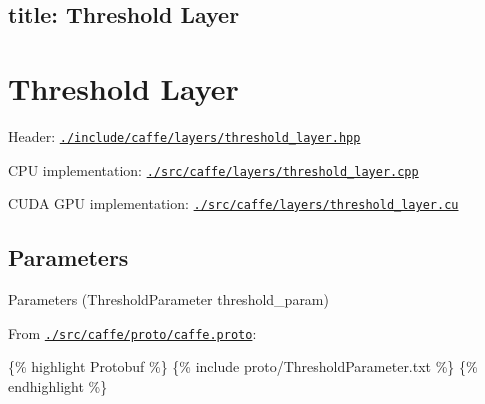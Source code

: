

 \subsection*{title\+: Threshold Layer }

\section*{Threshold Layer}


\begin{DoxyItemize}
\item Header\+: \href{https://github.com/BVLC/caffe/blob/master/include/caffe/layers/threshold_layer.hpp}{\tt {\ttfamily ./include/caffe/layers/threshold\+\_\+layer.hpp}}
\item C\+PU implementation\+: \href{https://github.com/BVLC/caffe/blob/master/src/caffe/layers/threshold_layer.cpp}{\tt {\ttfamily ./src/caffe/layers/threshold\+\_\+layer.cpp}}
\item C\+U\+DA G\+PU implementation\+: \href{https://github.com/BVLC/caffe/blob/master/src/caffe/layers/threshold_layer.cu}{\tt {\ttfamily ./src/caffe/layers/threshold\+\_\+layer.cu}}
\end{DoxyItemize}

\subsection*{Parameters}


\begin{DoxyItemize}
\item Parameters ({\ttfamily Threshold\+Parameter threshold\+\_\+param})
\item From \href{https://github.com/BVLC/caffe/blob/master/src/caffe/proto/caffe.proto}{\tt {\ttfamily ./src/caffe/proto/caffe.proto}}\+:
\end{DoxyItemize}

\{\% highlight Protobuf \%\} \{\% include proto/\+Threshold\+Parameter.\+txt \%\} \{\% endhighlight \%\} 